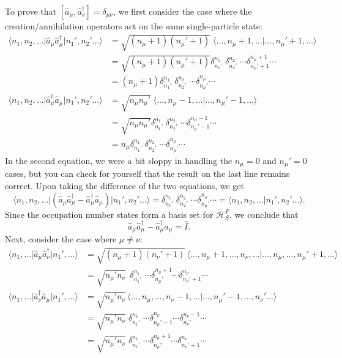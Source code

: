 \documentclass[pra,12pt]{revtex4}
\begin{document}
To prove that $[\hat{a}_\mu,\hat{a}_\nu^\dagger] = \delta_{\mu\nu}$,
we first consider the case where the creation/annihilation operators
act on the same single-particle state:
$$\begin{aligned}\big\langle n_1, n_2, \dots \big| \hat{a}_\mu \hat{a}_\mu^\dagger \big| n_1', n_2'\dots\big\rangle &= \sqrt{(n_\mu+1)(n_\mu'+1)}\; \big\langle \dots, n_\mu+1, \dots \big| \dots, n_\mu'+1, \dots\big\rangle \\ &= \sqrt{(n_\mu+1)(n_\mu'+1)} \delta^{n_1}_{n_1'} \; \delta^{n_2}_{n_2'} \; \cdots \delta^{n_\mu+1}_{n_\mu'+1}\cdots \\ &= (n_\mu+1) \delta^{n_1}_{n_1'} \; \delta^{n_2}_{n_2'} \; \cdots \delta^{n_\mu}_{n_\mu'}\cdots \\ \big\langle n_1, n_2, \dots \big| \hat{a}_\mu^\dagger \hat{a}_\mu \big| n_1', n_2'\dots\big\rangle &= \sqrt{n_\mu n_\mu'}\; \big\langle \dots, n_\mu-1, \dots \big| \dots, n_\mu'-1, \dots\big\rangle \\&= \sqrt{n_\mu n_\mu'} \delta^{n_1}_{n_1'} \; \delta^{n_2}_{n_2'} \; \cdots \delta^{n_\mu-1}_{n_\mu'-1}\cdots \\ &= n_\mu \delta^{n_1}_{n_1'} \; \delta^{n_2}_{n_2'} \; \cdots \delta^{n_\mu}_{n_\mu'}\cdots \end{aligned}$$
In the second equation, we were a bit sloppy in handling the $n_\mu =
0$ and $n_\mu' = 0$ cases, but you can check for yourself that the
result on the last line remains correct.  Upon taking the
difference of the two equations, we get
$$\big\langle n_1, n_2, \dots \big| \left(\hat{a}_\mu \hat{a}_\mu^\dagger - \hat{a}_\mu^\dagger \hat{a}_\mu\right) \big| n_1', n_2'\dots\big\rangle = \delta^{n_1}_{n_1'} \; \delta^{n_2}_{n_2'} \; \cdots \delta^{n_\mu}_{n_\mu'}\cdots = \big\langle n_1, n_2, \dots \big| n_1', n_2'\dots\big\rangle.$$
Since the occupation number states form a basis set for
$\mathscr{H}^F_S$, we conclude that
$$\hat{a}_\mu \hat{a}_\mu^\dagger - \hat{a}_\mu^\dagger \hat{a}_\mu = \hat{I}.$$
Next, consider the case where $\mu \ne \nu$:
$$\begin{aligned}\big\langle n_1, \dots \big| \hat{a}_\mu \hat{a}_\nu^\dagger \big| n_1', \dots\big\rangle &= \sqrt{(n_\mu+1)(n_\nu'+1)}\, \langle \dots, n_\mu+1, \dots, n_\nu, \dots | \dots, n_\mu, \dots, n_\mu'+1, \dots\rangle \\ &= \sqrt{n_\mu' n_\nu} \;\, \delta^{n_1}_{n_1'} \; \cdots \delta^{n_\mu+1}_{n_\mu'} \cdots \delta^{n_\nu}_{n_\nu' + 1}\cdots \\ \big\langle n_1, \dots \big| \hat{a}_\nu^\dagger \hat{a}_\mu \big| n_1', \dots\big\rangle &= \sqrt{n_\mu' n_\nu}\, \langle \dots, n_\mu, \dots,n_\nu-1,\dots | \dots, n_\mu'-1, \dots, n_\nu'\dots\rangle \\&= \sqrt{n_\mu' n_\nu} \;\delta^{n_1}_{n_1'} \; \cdots \delta^{n_\mu}_{n_\mu'-1}\cdots \delta^{n_\nu-1}_{n_\nu'} \cdots \\ &= \sqrt{n_\mu' n_\nu} \; \delta^{n_1}_{n_1'} \; \cdots \delta^{n_\mu+1}_{n_\mu'}\cdots \delta^{n_\nu}_{n_\nu'+1} \cdots\end{aligned}$$
\end{document}
